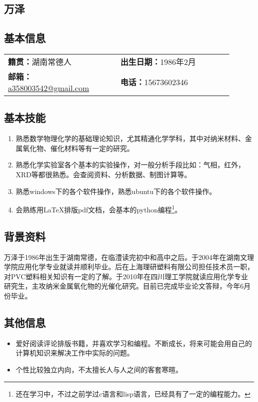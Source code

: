\documentclass[11pt,oneside]{book}
\begin{document}
\begin{common-format}

\chapter{万泽}
\vspace{15pt}

\section{基本信息}

\noindent
\begin{tabular}{p{0.45\linewidth} p{0.45\linewidth}}
\textbf{籍贯：}湖南常德人 & \textbf{出生日期：}1986年2月 \\ 
\textbf{邮箱：}\href{mailto: a358003542@gmail.com}{a358003542@gmail.com} & \textbf{电话：}15673602346 \\ 
\end{tabular} 


\section{基本技能}
\vspace{-5mm}
\begin{enumerate}
\item 熟悉数学物理化学的基础理论知识，尤其精通化学学科，其中对纳米材料、金属氧化物、催化材料等有一定的研究。
\item 熟悉化学实验室各个基本的实验操作，对一般分析手段比如：气相，红外，XRD等都很熟悉。会查阅资料、分析数据、制图计算等。
\item 熟悉windows下的各个软件操作，熟悉ubuntu下的各个软件操作。
\item 会熟练用\LaTeX 排版pdf文档，会基本的python编程\footnote{还在学习中，不过之前学过c语言和lisp语言，已经具有了一定的编程能力。}。
\end{enumerate}


\section{背景资料}
万泽于1986年出生于湖南常德，在临澧读完初中和高中之后。于2004年在湖南文理学院应用化学专业就读并顺利毕业。后在上海理研塑料有限公司担任技术员一职，对PVC塑料相关知识有一定的了解。于2010年在四川理工学院就读应用化学专业研究生，主攻纳米金属氧化物的光催化研究。目前已完成毕业论文答辩，今年6月份毕业。

\section{其他信息}
\vspace{-5mm}
\begin{itemize}
\item 爱好阅读评论排版书籍，并喜欢学习和编程。不断成长，将来可能会用自己的计算机知识来解决工作中实际的问题。
\item 个性比较独立内向，不太擅长人与人之间的客套寒暄。
\end{itemize}



\end{common-format}
\end{document}
